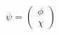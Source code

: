 \begin{equation}
\psi =\left( 
\begin{array}{c}
\phi \\ 
\chi
\end{array}
\right)  \label{eq8a}
\end{equation}

